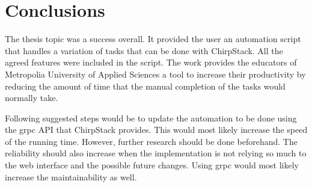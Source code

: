 
\chapter{Conclusions} \label{ch:conc}

The thesis topic was a success overall.
It provided the user an automation script that handles a variation of tasks that can be done with ChirpStack.
All the agreed features were included in the script.
The work provides the educators of Metropolia University of Applied Sciences a tool to increase their productivity by reducing the amount of time that the manual completion of the tasks would normally take.

Following suggested steps would be to update the automation to be done using the \gls{grpc} API that ChirpStack provides.
This would most likely increase the speed of the running time.
However, further research should be done beforehand.
The reliability should also increase when the implementation is not relying so much to the web interface and the possible future changes.
Using \gls{grpc} would most likely increase the maintainability as well.


\clearpage %
